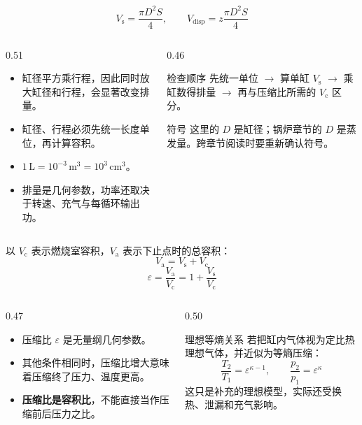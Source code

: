 \begin{frame}[t,shrink]{}
$$
V_{\mathrm{s}}=\frac{\pi D^2S}{4},
\qquad
V_{\mathrm{disp}}=z\frac{\pi D^2S}{4}
$$
\begin{columns}[T,onlytextwidth]
\begin{column}{0.51\textwidth}
  \begin{itemize}
    \item 缸径平方乘行程，因此同时放大缸径和行程，会显著改变排量。
    \item 缸径、行程必须先统一长度单位，再计算容积。
    \item \(1\,\mathrm{L}=10^{-3}\,\mathrm{m^3}=10^3\,\mathrm{cm^3}\)。
    \item 排量是几何参数，功率还取决于转速、充气与每循环输出功。
  \end{itemize}
\end{column}
\begin{column}{0.46\textwidth}
  \begin{keybox}{检查顺序}
  \small 先统一单位 $\rightarrow$ 算单缸 \(V_{\mathrm{s}}\) $\rightarrow$ 乘缸数得排量 $\rightarrow$ 再与压缩比所需的 \(V_{\mathrm{c}}\) 区分。
  \end{keybox}
  \vspace{0.6mm}
  \begin{amberbox}{符号}
  \small 这里的 \(D\) 是缸径；锅炉章节的 \(D\) 是蒸发量。跨章节阅读时要重新确认符号。
  \end{amberbox}
\end{column}
\end{columns}
\end{frame}

\begin{frame}[t,shrink]{}
以 \(V_{\mathrm{c}}\) 表示燃烧室容积，\(V_{\mathrm{a}}\) 表示下止点时的总容积：
$$
V_{\mathrm{a}}=V_{\mathrm{s}}+V_{\mathrm{c}}
$$
$$
\varepsilon=\frac{V_{\mathrm{a}}}{V_{\mathrm{c}}}
=1+\frac{V_{\mathrm{s}}}{V_{\mathrm{c}}}
$$
\begin{columns}[T,onlytextwidth]
\begin{column}{0.47\textwidth}
  \begin{itemize}
    \item 压缩比 \(\varepsilon\) 是无量纲几何参数。
    \item 其他条件相同时，压缩比增大意味着压缩终了压力、温度更高。
    \item \textbf{压缩比是容积比}，不能直接当作压缩前后压力之比。
  \end{itemize}
\end{column}
\begin{column}{0.50\textwidth}
  \begin{keybox}{理想等熵关系}
  \small 若把缸内气体视为定比热理想气体，并近似为等熵压缩：
  $$
  \frac{T_2}{T_1}=\varepsilon^{\kappa-1},
  \qquad
  \frac{p_2}{p_1}=\varepsilon^{\kappa}
  $$
  这只是补充的理想模型，实际还受换热、泄漏和充气影响。
  \end{keybox}
\end{column}
\end{columns}
\end{frame}

